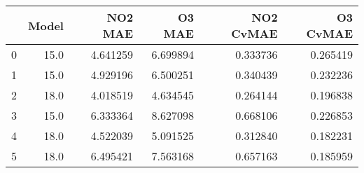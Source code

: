 \begin{tabular}{lrrrrr}
\toprule
{} &  Model &   NO2 MAE &    O3 MAE &  NO2 CvMAE &  O3 CvMAE \\
\midrule
0 &   15.0 &  4.641259 &  6.699894 &   0.333736 &  0.265419 \\
1 &   15.0 &  4.929196 &  6.500251 &   0.340439 &  0.232236 \\
2 &   18.0 &  4.018519 &  4.634545 &   0.264144 &  0.196838 \\
3 &   15.0 &  6.333364 &  8.627098 &   0.668106 &  0.226853 \\
4 &   18.0 &  4.522039 &  5.091525 &   0.312840 &  0.182231 \\
5 &   18.0 &  6.495421 &  7.563168 &   0.657163 &  0.185959 \\
\bottomrule
\end{tabular}

